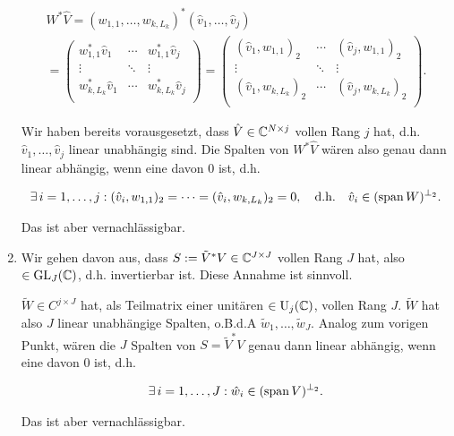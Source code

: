 \begin{enumerate}[label = \arabic*.]
    \begin{multline*}
        W^\ast \hat V
        =
        (w_{1, 1}, \dots, w_{k, L_k})^\ast (\hat v_1, \dots, \hat v_j) \\
        =
        \begin{pmatrix}
            w_{1, 1}^\ast   \hat v_1 & \cdots & w_{1, 1}^\ast   \hat v_j \\
            \vdots                   & \ddots & \vdots                   \\
            w_{k, L_k}^\ast \hat v_1 & \cdots & w_{k, L_k}^\ast \hat v_j \\
        \end{pmatrix}
        =
        \begin{pmatrix}
            (\hat v_1, w_{1, 1})_2   & \cdots & (\hat v_j, w_{1, 1})_2   \\
            \vdots                        & \ddots & \vdots                   \\
            (\hat v_1, w_{k, L_k})_2 & \cdots & (\hat v_j, w_{k, L_k})_2 \\
        \end{pmatrix}.
    \end{multline*}

    Wir haben bereits vorausgesetzt, dass $\hat V \in \mathbb{C}^{N \times j}$ vollen Rang $j$ hat, d.h. $\hat v_1, \dots, \hat v_j$ linear unabhängig sind.
    Die Spalten von $W^\ast \hat V$ wären also genau dann linear abhängig, wenn eine davon $0$ ist, d.h.

    \begin{align*}
        \exists \, i = 1, \dots, j:
            (\hat v_i, w_{1, 1})_2 = \cdots = (\hat v_i, w_{k, L_k})_2 = 0,
            \quad
            \text{d.h.}
            \quad
            \hat v_i \in (\operatorname{span} W)^{\bot_2}.
    \end{align*}

    Das ist aber vernachlässigbar.

    \item Wir gehen davon aus, dass $S := \tilde V^\ast V \in \mathbb{C}^{J \times J}$ vollen Rang $J$ hat, also $\in \operatorname{GL}_J(\mathbb{C})$, d.h. invertierbar ist.
    Diese Annahme ist sinnvoll.

    $\tilde W \in C^{j \times J}$ hat, als Teilmatrix einer unitären $\in \operatorname{U}_j(\mathbb{C})$, vollen Rang $J$.
    $\tilde W$ hat also $J$ linear unabhängige Spalten, o.B.d.A $\tilde w_1, \dots, \tilde w_J$.
    Analog zum vorigen Punkt, wären die $J$ Spalten von $S = \tilde V^\ast V$ genau dann linear abhängig, wenn eine davon $0$ ist, d.h.

    \begin{align*}
        \exists \, i = 1, \dots, J:
            \hat w_i \in (\operatorname{span} V)^{\bot_2}.
    \end{align*}

    Das ist aber vernachlässigbar.

\end{enumerate}

